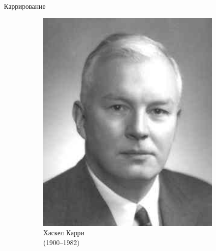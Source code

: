 \begin{frame}{Каррирование}
\begin{figure}[t]
\begin{subfigure}[t]{.25\textwidth}
\begin{minipage}{1\textwidth}
      \includegraphics[width=1\textwidth]{Haskell_Curry.jpg}\\
      \centering Хаскел Карри \\(1900--1982)
    \end{minipage}
  \end{subfigure}
\end{figure}
\end{frame}



